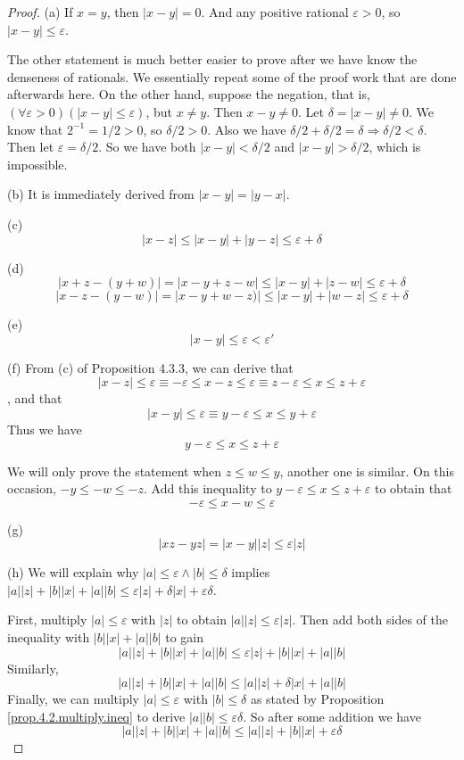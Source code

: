 \begin{proof}
(a)
If $x=y$, then $|x-y| = 0$. And any positive rational $\varepsilon >0$, so $|x-y|\leq\varepsilon$.

The other statement is much better easier to prove after we have know the denseness of rationals. We 
essentially repeat some of the proof work that are done afterwards here.
On the other hand, suppose the negation, that is, $(\forall \varepsilon>0)(|x-y| \leq \varepsilon)$, but 
$x\neq y$. Then $x-y \neq 0$. Let $\delta = |x-y| \neq 0$. We know that $2^{-1} = 1/2 > 0$, so 
$\delta / 2 > 0$. Also we have $\delta /2 + \delta /2 = \delta \Longrightarrow \delta /2 < \delta$. Then let 
$\varepsilon = \delta /2$. So we have both $|x-y| < \delta/2$ and $|x-y| > \delta /2$, which is impossible. 

(b)
It is immediately derived from $|x-y| = |y-x|$.

(c)
\[
|x-z| \leq |x-y| + |y-z| \leq \varepsilon + \delta
\]

(d)
\[
|x+z - (y+w)| = |x-y + z-w| \leq |x-y| + |z-w| \leq \varepsilon + \delta
\]
\[
|x-z - (y-w)| = |x-y + w-z)| \leq |x-y| + |w-z| \leq \varepsilon + \delta
\]

(e)
\[
|x-y| \leq \varepsilon < \varepsilon'
\]

(f)
From (c) of Proposition 4.3.3, we can derive that
\[
|x-z| \leq \varepsilon \equiv -\varepsilon \leq x-z \leq \varepsilon 
\equiv z-\varepsilon \leq x \leq z+ \varepsilon
\]
, and that
\[
|x-y| \leq \varepsilon \equiv y-\varepsilon \leq x \leq y + \varepsilon
\]
Thus we have
\[
y-\varepsilon \leq x \leq z + \varepsilon
\]

We will only prove the statement when $z\leq w \leq y$, another one is similar. On this occasion, 
$-y \leq -w \leq -z$. Add this inequality to $y-\varepsilon \leq x \leq z + \varepsilon$ to obtain that 
\[
-\varepsilon \leq x-w \leq \varepsilon
\]

(g)
\[
|xz-yz| = |x-y||z| \leq \varepsilon|z|
\]

(h)
We will explain why $|a| \leq \varepsilon \wedge |b| \leq \delta$ implies 
$|a||z| + |b||x| + |a||b| \leq \varepsilon|z| + \delta|x| + \varepsilon\delta$.

First, multiply $|a| \leq \varepsilon$ with $|z|$ to obtain $|a||z| \leq \varepsilon |z|$. Then add both sides 
of the inequality with $|b||x| + |a||b|$ to gain 
\[
|a||z| + |b||x| + |a||b| \leq \varepsilon |z| + |b||x| + |a||b| \tag{1}
\]
Similarly,
\[
|a||z| + |b||x| + |a||b| \leq |a||z| + \delta |x| + |a||b| \tag{2}
\]
Finally, we can multiply $|a| \leq \varepsilon$ with $|b| \leq \delta$ as stated by Proposition 
\ref{prop.4.2.multiply.ineq} to derive $|a||b| \leq \varepsilon\delta$. So after some addition we have
\[
|a||z| + |b||x| + |a||b| \leq |a||z| + |b||x| + \varepsilon\delta \tag{3}
\]


\end{proof}
